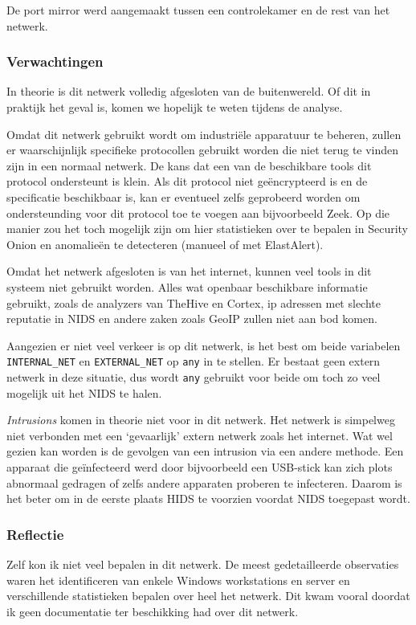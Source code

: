 \documentclass[a4paper,12pt]{report}
\begin{document}
De port mirror werd aangemaakt tussen een controlekamer en de rest van het netwerk.

\subsubsection{Verwachtingen}
In theorie is dit netwerk volledig afgesloten van de buitenwereld.
Of dit in praktijk het geval is, komen we hopelijk te weten tijdens de analyse.

Omdat dit netwerk gebruikt wordt om industriële apparatuur te beheren, zullen er waarschijnlijk specifieke protocollen gebruikt worden die niet terug te vinden zijn in een normaal netwerk.
De kans dat een van de beschikbare tools dit protocol ondersteunt is klein.
Als dit protocol niet geëncrypteerd is en de specificatie beschikbaar is, kan er eventueel zelfs geprobeerd worden om ondersteunding voor dit protocol toe te voegen aan bijvoorbeeld Zeek.
Op die manier zou het toch mogelijk zijn om hier statistieken over te bepalen in Security Onion en anomalieën te detecteren (manueel of met ElastAlert).

Omdat het netwerk afgesloten is van het internet, kunnen veel tools in dit systeem niet gebruikt worden.
Alles wat openbaar beschikbare informatie gebruikt, zoals de analyzers van TheHive en Cortex, ip adressen met slechte reputatie in NIDS en andere zaken zoals GeoIP zullen niet aan bod komen.

Aangezien er niet veel verkeer is op dit netwerk, is het best om beide variabelen \lstinline|INTERNAL_NET| en \lstinline|EXTERNAL_NET| op \lstinline|any| in te stellen.
Er bestaat geen extern netwerk in deze situatie, dus wordt \lstinline|any| gebruikt voor beide om toch zo veel mogelijk uit het NIDS te halen.

\emph{Intrusions} komen in theorie niet voor in dit netwerk.
Het netwerk is simpelweg niet verbonden met een `gevaarlijk' extern netwerk zoals het internet.
Wat wel gezien kan worden is de gevolgen van een intrusion via een andere methode.
Een apparaat die geïnfecteerd werd door bijvoorbeeld een USB-stick kan zich plots abnormaal gedragen of zelfs andere apparaten proberen te infecteren.
Daarom is het beter om in de eerste plaats HIDS te voorzien voordat NIDS toegepast wordt.


\subsubsection{Reflectie}
Zelf kon ik niet veel bepalen in dit netwerk.
De meest gedetailleerde observaties waren het identificeren van enkele Windows workstations en server en verschillende statistieken bepalen over heel het netwerk.
Dit kwam vooral doordat ik geen documentatie ter beschikking had over dit netwerk.
\end{document}
